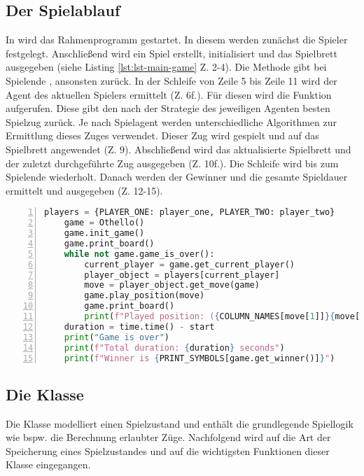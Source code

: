 \subsection{Der Spielablauf}
In  wird das Rahmenprogramm gestartet. In diesem werden zunächst die Spieler festgelegt. Anschließend wird ein Spiel erstellt, initialisiert und das Spielbrett ausgegeben (siehe Listing \ref{lst:lst-main-game} Z. 2-4). Die Methode  gibt bei Spielende , ansonsten  zurück. In der Schleife von Zeile 5 bis Zeile 11 wird der Agent des aktuellen Spielers ermittelt (Z. 6f.). Für diesen wird die Funktion  aufgerufen. Diese gibt den nach der Strategie des jeweiligen Agenten besten Spielzug zurück. Je nach Spielagent werden unterschiedliche Algorithmen zur Ermittlung dieses Zuges verwendet. Dieser Zug wird gespielt und auf das Spielbrett angewendet (Z. 9). Abschließend wird das aktualisierte Spielbrett und der zuletzt durchgeführte Zug ausgegeben (Z. 10f.). Die Schleife wird bis zum Spielende wiederholt. Danach werden der Gewinner und die gesamte Spieldauer ermittelt und ausgegeben (Z. 12-15). 
\begin{lstlisting}[basicstyle=\footnotesize, caption = {Spielablauf in \mxZitat{main-game.py}}, language = python, captionpos = t , numbers=left, label={lst:lst-main-game}]
    players = {PLAYER_ONE: player_one, PLAYER_TWO: player_two}
    game = Othello()
    game.init_game()
    game.print_board()
    while not game.game_is_over():
        current_player = game.get_current_player()
        player_object = players[current_player]
        move = player_object.get_move(game)
        game.play_position(move)
        game.print_board()
        print(f"Played position: ({COLUMN_NAMES[move[1]]}{move[0] + 1})")
    duration = time.time() - start
    print("Game is over")
    print(f"Total duration: {duration} seconds")
    print(f"Winner is {PRINT_SYMBOLS[game.get_winner()]}")
\end{lstlisting}
\subsection{Die Klasse }
\label{ot1}
\authormax
Die Klasse  modelliert einen Spielzustand und enthält die grundlegende Spiellogik wie bspw. die Berechnung erlaubter Züge. Nachfolgend wird auf die Art der Speicherung eines Spielzustandes und auf die wichtigsten Funktionen dieser Klasse eingegangen.
